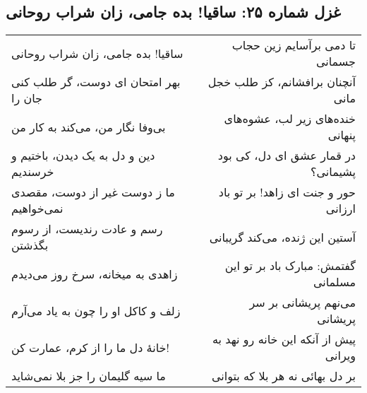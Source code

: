 \begin{center}
\section*{غزل شماره ۲۵: ساقیا! بده جامی، زان شراب روحانی}
\label{sec:025}
\begin{longtable}{l p{0.5cm} r}
ساقیا! بده جامی، زان شراب روحانی
&&
تا دمی برآسایم زین حجاب جسمانی
\\
بهر امتحان ای دوست، گر طلب کنی جان را
&&
آنچنان برافشانم، کز طلب خجل مانی
\\
بی‌وفا نگار من، می‌کند به کار من
&&
خنده‌های زیر لب، عشوه‌های پنهانی
\\
دین و دل به یک دیدن، باختیم و خرسندیم
&&
در قمار عشق ای دل، کی بود پشیمانی؟
\\
ما ز دوست غیر از دوست، مقصدی نمی‌خواهیم
&&
حور و جنت ای زاهد! بر تو باد ارزانی
\\
رسم و عادت رندیست، از رسوم بگذشتن
&&
آستین این ژنده، می‌کند گریبانی
\\
زاهدی به میخانه، سرخ روز می‌دیدم
&&
گفتمش: مبارک باد بر تو این مسلمانی
\\
زلف و کاکل او را چون به یاد می‌آرم
&&
می‌نهم پریشانی بر سر پریشانی
\\
خانهٔ دل ما را از کرم، عمارت کن!
&&
پیش از آنکه این خانه رو نهد به ویرانی
\\
ما سیه گلیمان را جز بلا نمی‌شاید
&&
بر دل بهائی نه هر بلا که بتوانی
\\
\end{longtable}
\end{center}
